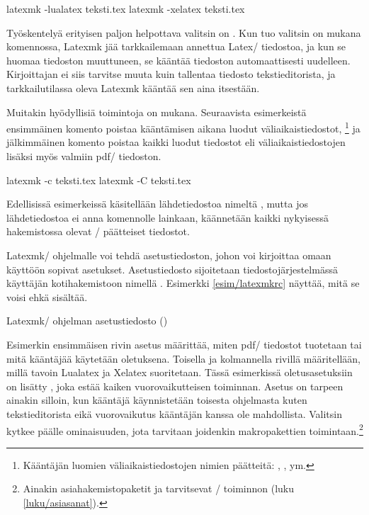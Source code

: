 \begin{koodilohkosis}
latexmk -lualatex teksti.tex
latexmk -xelatex  teksti.tex
\end{koodilohkosis}

\noindent
Työskentelyä erityisen paljon helpottava valitsin on . Kun
tuo valitsin on mukana komennossa, Latexmk jää tarkkailemaan annettua
Latex\-/ tiedostoa, ja kun se huomaa tiedoston muuttuneen, se kääntää
tiedoston automaattisesti uudelleen. Kirjoittajan ei siis tarvitse muuta
kuin tallentaa tiedosto tekstieditorista, ja tarkkailutilassa oleva
Latexmk kääntää sen aina itsestään.

Muitakin hyödyllisiä toimintoja on mukana. Seuraavista esimerkeistä
ensimmäinen komento poistaa kääntämisen aikana luodut
väliaikaistiedostot,%
\footnote{Kääntäjän luomien väliaikaistiedostojen nimien päätteitä:
  , ,  ym.} ja jälkimmäinen komento
poistaa kaikki luodut tiedostot eli väliaikaistiedostojen lisäksi myös
valmiin pdf\-/ tiedoston.

\begin{koodilohkosis}
latexmk -c teksti.tex
latexmk -C teksti.tex
\end{koodilohkosis}

\noindent
Edellisissä esimerkeissä käsitellään lähdetiedostoa nimeltä
, mutta jos lähdetiedostoa ei anna komennolle
lainkaan, käännetään kaikki nykyisessä hakemistossa olevat
\-/ päätteiset tiedostot.

Latexmk\-/ ohjelmalle voi tehdä asetustiedoston, johon voi kirjoittaa
omaan käyttöön sopivat asetukset. Asetustiedosto sijoitetaan
tiedostojärjestelmässä käyttäjän kotihakemistoon nimellä
. Esimerkki \ref{esim/latexmkrc} näyttää, mitä se
voisi ehkä sisältää.

\begin{esimerkki*}
  \caption{Latexmk\-/ ohjelman asetustiedosto ()}
  \label{esim/latexmkrc}
\end{esimerkki*}

Esimerkin ensimmäisen rivin asetus määrittää, miten pdf\-/ tiedostot
tuotetaan tai mitä kääntäjää käytetään oletuksena. Toisella ja
kolmannella rivillä määritellään, millä tavoin Lualatex ja Xelatex
suoritetaan. Tässä esimerkissä oletusasetuksiin on lisätty
, joka estää kaiken
vuorovaikutteisen toiminnan. Asetus on tarpeen ainakin silloin, kun
kääntäjä käynnistetään toisesta ohjelmasta kuten tekstieditorista eikä
vuorovaikutus kääntäjän kanssa ole mahdollista. Valitsin
 kytkee päälle ominaisuuden, jota tarvitaan
joidenkin makropakettien toimintaan.\footnote{Ainakin
  asiahakemistopaketit  ja 
  tarvitsevat \-/ toiminnon (luku
  \ref{luku/asiasanat}).}

